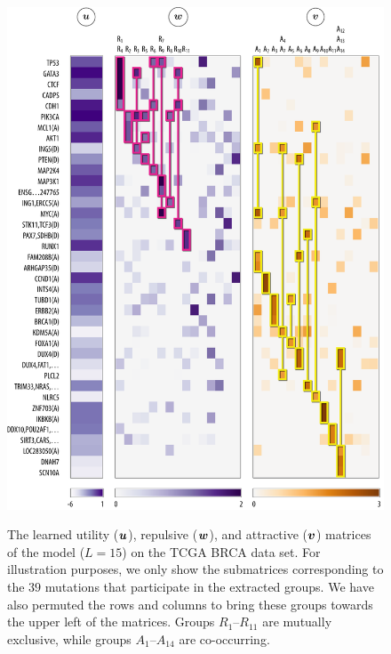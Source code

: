 \begin{figure}[htbp]
\centering
\includegraphics[width=\textwidth]{figures/genes/mat_brca.pdf}\\[2em]
\caption{The learned utility ($\bm{u}$), repulsive ($\bm{w}$), and attractive ($\bm{v}$) matrices of the \fldc{} model ($L = 15$) on the TCGA BRCA data set.
For illustration purposes, we only show the submatrices corresponding to the $39$ mutations that participate in the extracted groups.
We have also permuted the rows and columns to bring these groups towards the upper left of the matrices.
Groups $R_1$--$R_{11}$ are mutually exclusive, while groups $A_1$--$A_{14}$ are co-occurring.
}
\label{fig:mat_brca}
\end{figure}

